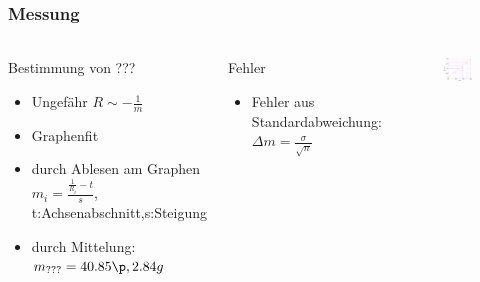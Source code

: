 \begin{frame}
    \frametitle{Messung}
    \framesubtitle{}
    \begin{columns}[c]
        \begin{block}{Bestimmung von ???}
             \begin{itemize}
                 \item Ungefähr $R \sim - \frac{1}{m}$
                 \item Graphenfit 
                 \item durch Ablesen am Graphen $m_i = \frac{
                 \frac{1}{R_i}-t}{s}$, t:Achsenabschnitt,s:Steigung
                 \item durch Mittelung: $m_{???} = 40.85 \p, 2.84g$
             \end{itemize}
        \end{block}
        \begin{block}{Fehler}
             \begin{itemize}
                 \item Fehler aus Standardabweichung: $\Delta m =
                 \frac{\sigma}{\sqrt{n}}$
             \end{itemize}
         \end{block}
         \begin{figure}[H]
         \begin{center}
                 \includegraphics[scale=0.3]{./img/plots/1d_unb.eps}
         \end{center}
         \end{figure}
     \end{columns}
\end{frame}

